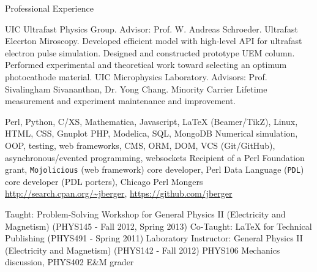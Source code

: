 \begin{rubric}{Professional Experience}


  \entry*[2005 --- \ldots] UIC Ultrafast Physics Group. Advisor: Prof. W. Andreas Schroeder. Ultrafast Elecrton Miroscopy.
  \entry* Developed efficient model with high-level API for ultrafast electron pulse simulation. 
  \entry* Designed and constructed prototype UEM column.
  \entry* Performed experimental and theoretical work toward selecting an optimum photocathode material.
  \entry*[2003 --- 2005] UIC Microphysics Laboratory. Advisors: Prof. Sivalingham Sivananthan, Dr. Yong Chang.
  \entry* Minority Carrier Lifetime measurement and experiment maintenance and improvement.


  \entry*[Proficient in] Perl, Python, C/XS, Mathematica, Javascript, \LaTeX{} (Beamer/TikZ), Linux, HTML, CSS, Gnuplot
   PHP, Modelica, SQL, MongoDB
  \entry*[Concepts] Numerical simulation, OOP, testing, web frameworks, CMS, ORM, DOM, VCS (Git/GitHub), asynchronous/evented programming, websockets
  \entry*[Affiliations] Recipient of a Perl Foundation grant, \texttt{Mojolicious} (web framework) core developer, Perl Data Language (\texttt{PDL}) core developer (PDL porters), Chicago Perl Mongers
  \entry*[Code] \url{http://search.cpan.org/~jberger}, \url{https://github.com/jberger}
  

  \entry*[Teaching] Taught: Problem-Solving Workshop for General Physics II (Electricity and Magnetism) (PHYS145 - Fall 2012, Spring 2013) 
  \entry*[Teaching] Co-Taught: \LaTeX{} for Technical Publishing (PHYS491 - Spring 2011)
  \entry*[T.A.] Laboratory Instructor: General Physics II (Electricity and Magnetism) (PHYS142 - Fall 2012)
  \entry*[T.A.] PHYS106 Mechanics discussion, PHYS402 E\&M grader

\end{rubric}
